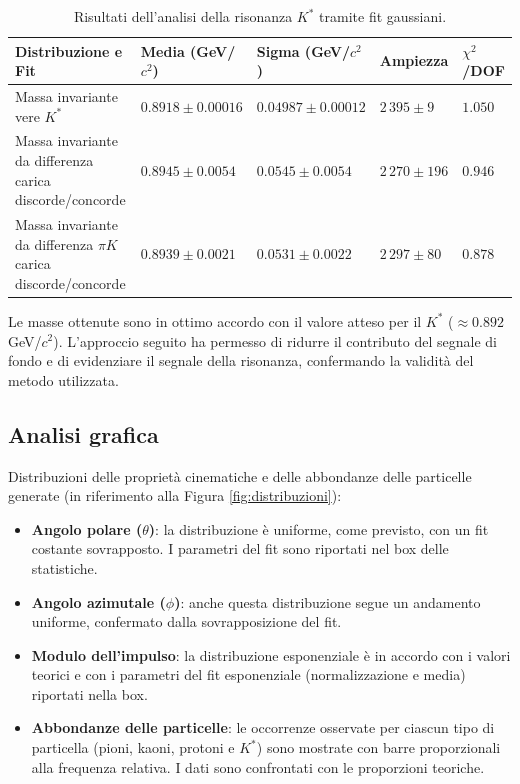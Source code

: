 \documentclass[a4paper,11pt]{article}
\begin{document}
\begin{table}[h!]
    \centering
    \begin{tabular}{|m{2.5cm}|>{\centering\arraybackslash}m{2cm}|>{\centering\arraybackslash}m{2cm}|>{\centering\arraybackslash}m{2cm}|>{\centering\arraybackslash}m{1.5cm}|}
        \hline
        \textbf{Distribuzione e Fit} & \textbf{Media (GeV/$c^2$)} & \textbf{Sigma (GeV/$c^2$)} & \textbf{Ampiezza} & $\chi^2$/DOF \\
        \hline
        Massa invariante vere \( K^* \) & $0.8918 \pm 0.00016$ & $0.04987 \pm 0.00012$ & $2\,395 \pm 9$ & $1.050$ \\
        \hline
        Massa invariante da differenza carica discorde/concorde & $0.8945 \pm 0.0054$ & $0.0545 \pm 0.0054$ & $2\,270 \pm 196$ & $0.946$ \\
        \hline
        Massa invariante da differenza $\pi K$ carica discorde/concorde & $0.8939 \pm 0.0021$ & $0.0531 \pm 0.0022$ & $2\,297 \pm 80$ & $0.878$ \\
        \hline
    \end{tabular}
    \caption{Risultati dell'analisi della risonanza \( K^* \) tramite fit gaussiani.}
    \label{tab:kstar}
\end{table}

Le masse ottenute sono in ottimo accordo con il valore atteso per il \( K^* \) ($\approx 0.892$ GeV/$c^2$). L'approccio seguito ha permesso di ridurre il contributo del segnale di fondo e di evidenziare il segnale della risonanza, confermando la validità del metodo utilizzata.

\clearpage

\subsection{Analisi grafica}

Distribuzioni delle proprietà cinematiche e delle abbondanze delle particelle generate (in riferimento alla Figura \ref{fig:distribuzioni}):

\begin{itemize}
    \item \textbf{Angolo polare (\( \theta \))}: la distribuzione è uniforme, come previsto, con un fit costante sovrapposto. I parametri del fit sono riportati nel box delle statistiche.
    \item \textbf{Angolo azimutale (\( \phi \))}: anche questa distribuzione segue un andamento uniforme, confermato dalla sovrapposizione del fit.
    \item \textbf{Modulo dell'impulso}: la distribuzione esponenziale è in accordo con i valori teorici e con i parametri del fit esponenziale (normalizzazione e media) riportati nella box.
    \item \textbf{Abbondanze delle particelle}: le occorrenze osservate per ciascun tipo di particella (pioni, kaoni, protoni e \( K^* \)) sono mostrate con barre proporzionali alla frequenza relativa. I dati sono confrontati con le proporzioni teoriche.
\end{itemize}
\end{document}
